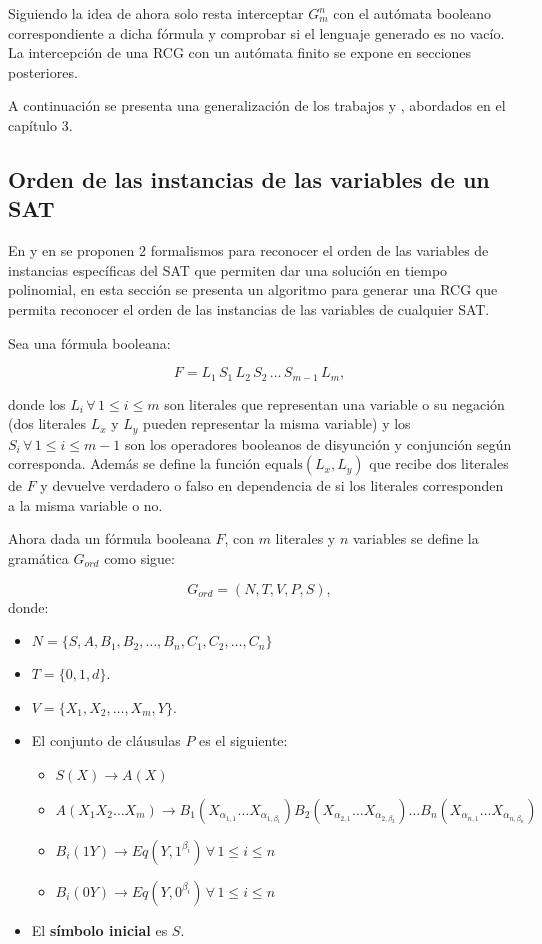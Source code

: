 Siguiendo la idea de \cite{aSMSAT} ahora solo resta interceptar $G^n_m$ con el autómata booleano correspondiente a dicha
fórmula y comprobar si el lenguaje generado es no vacío. La intercepción de una RCG con un autómata finito se expone en secciones posteriores.

A continuación se presenta una generalización de los trabajos \cite{aCFSAT} y \cite{aSRCSAT}, abordados en el capítulo 3.

\subsection{Orden de las instancias de las variables de un SAT}

En \cite{aCFSAT} y en \cite{aSRCSAT} se proponen 2 formalismos para reconocer el orden de las variables de instancias específicas
del SAT que permiten dar una solución en tiempo polinomial, en esta sección se presenta un algoritmo para generar una
RCG que permita reconocer el orden de las instancias de las variables de cualquier SAT.

Sea una fórmula booleana:

$$F=L_1\,S_1\,L_2\,S_2\,\ldots\,S_{m-1}\,L_m,$$

donde los $L_i\,\forall\,1\leq i\leq m$ son literales que representan una variable o su negación (dos literales
$L_x$ y $L_y$ pueden representar la misma variable) y los $S_i\,\forall\,1\leq i\leq m-1$ son los operadores
booleanos de disyunción y conjunción según corresponda. Además se define la función $\text{equals}(L_x,L_y)$
que recibe dos literales de $F$ y devuelve verdadero o falso en dependencia de si los literales corresponden
a la misma variable o no.

Ahora dada un fórmula booleana $F$, con $m$ literales y $n$ variables se define la gramática $G_{ord}$
como sigue:

\[
    G_{ord} = (N, T, V, P, S),
\]
donde:

\begin{itemize}
    \item $N=\{S,A,B_1,B_2,\ldots,B_n,C_1,C_2,\ldots,C_n\}$
    \item $T=\{0,1,d\}$.
    \item $V=\{X_1,X_2,\ldots,X_m,Y\}$.
    \item El conjunto de cláusulas $P$ es el siguiente:
          \begin{itemize}
              \item  $S(X)\to A(X)$
              \item $A(X_1X_2\ldots X_m)\to
                        B_1(X_{\alpha_{1,1}}\ldots X_{\alpha_{1,\beta_1}})
                        B_2(X_{\alpha_{2,1}}\ldots X_{\alpha_{2,\beta_2}})
                        \ldots B_n(X_{\alpha_{n,1}}\ldots X_{\alpha_{n,\beta_n}})$
              \item $B_i(1Y)\to  Eq(Y,1^{\beta_i})\,\forall \,1\leq i\leq n$

              \item $B_i(0Y)\to  Eq(Y,0^{\beta_i})\,\forall \,1\leq i\leq n$
          \end{itemize}
    \item El \textbf{símbolo inicial} es $S$.
\end{itemize}

